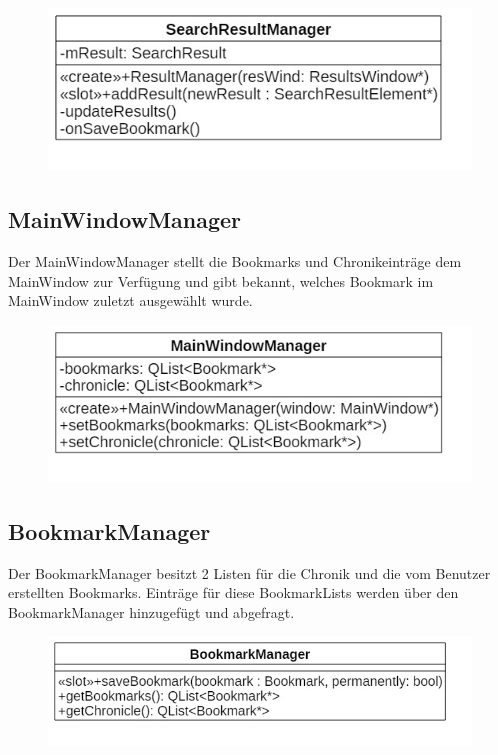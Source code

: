 \begin{figure}[H]
\centering
\includegraphics[scale=0.5]{img/Klassendiagramm/Klassen/Controller/SearchResultManager}
\label{fig:searchResultManager}
\end{figure}

\subsection*{MainWindowManager}
Der MainWindowManager stellt die Bookmarks und Chronikeinträge dem MainWindow zur Verfügung und gibt bekannt, welches Bookmark im MainWindow zuletzt ausgewählt wurde.

\begin{figure}[H]
\centering
\includegraphics[scale=0.5]{img/Klassendiagramm/Klassen/Controller/MainWindowManager}
\label{fig:mainWindowManager}
\end{figure}

\subsection*{BookmarkManager}
Der BookmarkManager besitzt 2 Listen für die Chronik und die vom Benutzer erstellten Bookmarks. Einträge für diese BookmarkLists werden über den BookmarkManager hinzugefügt und abgefragt.

\begin{figure}[H]
\centering
\includegraphics[scale=0.5]{img/Klassendiagramm/Klassen/Controller/BookmarkManager}
\label{fig:bookmarkManager}
\end{figure}
